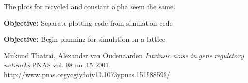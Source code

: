 \documentclass[oneside]{labbook}
\newcommand{\obj}[1]{\textbf{Objective:} #1\\}
\begin{document}
The plots for recycled and constant alpha seem the same.




\obj{Separate plotting code from simulation code}





\obj{Begin planning for simulation on a lattice}

\begin{thebibliography}{2}
Mukund Thattai, Alexander van Oudenaarden
\emph{Intrinsic noise in gene regulatory networks}
PNAS vol. 98 no. 15
2001.
http://www.pnas.orgycgiydoiy10.1073ypnas.151588598/
\end{thebibliography}
\end{document}
